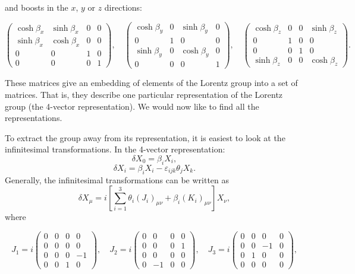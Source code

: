 \documentclass[11pt]{article}
\theoremstyle{definition}
\begin{document}
and boosts in the \( x \), \( y \) or \( z \) directions:

\[
\begin{pmatrix}
\cosh\beta_x & \sinh\beta_x & 0 & 0 \\
\sinh\beta_x & \cosh\beta_x & 0 & 0 \\
0 & 0 & 1 & 0 \\
0 & 0 & 0 & 1
\end{pmatrix},
\quad
\begin{pmatrix}
\cosh\beta_y & 0 & \sinh\beta_y & 0 \\
0 & 1 & 0 & 0 \\
\sinh\beta_y & 0 & \cosh\beta_y & 0 \\
0 & 0 & 0 & 1
\end{pmatrix},
\quad
\begin{pmatrix}
\cosh\beta_z & 0 & 0 & \sinh\beta_z \\
0 & 1 & 0 & 0 \\
0 & 0 & 1 & 0 \\
\sinh\beta_z & 0 & 0 & \cosh\beta_z
\end{pmatrix}.
\]

These matrices give an embedding of elements of the Lorentz group into a set of matrices. That is, they describe one particular representation of the Lorentz group (the 4-vector representation). We would now like to find all the representations.

To extract the group away from its representation, it is easiest to look at the infinitesimal transformations. In the 4-vector representation:
\begin{equation}
    \delta X_0 = \beta_i X_i,
\end{equation}
\begin{equation}
    \delta X_i = \beta_i X_i - \varepsilon_{ijk}\theta_j X_k.
\end{equation}
Generally, the infinitesimal transformations can be written as 
\begin{equation}
    \delta X_\mu = i\left[ \sum_{i=1}^3\theta_i(J_i)_{\mu\nu} + \beta_i(K_i)_{\mu\nu} \right]X_\nu,
\end{equation}
where

\[
J_1 = i\begin{pmatrix}
0 & 0 & 0 & 0 \\
0 & 0 & 0 & 0 \\
0 & 0 & 0 & -1 \\
0 & 0 & 1 & 0
\end{pmatrix}, \quad
J_2 = i\begin{pmatrix}
0 & 0 & 0 & 0 \\
0 & 0 & 0 & 1 \\
0 & 0 & 0 & 0 \\
0 & -1 & 0 & 0
\end{pmatrix}, \quad
J_3 = i\begin{pmatrix}
0 & 0 & 0 & 0 \\
0 & 0 & -1 & 0 \\
0 & 1 & 0 & 0 \\
0 & 0 & 0 & 0
\end{pmatrix},
\]
\end{document}

